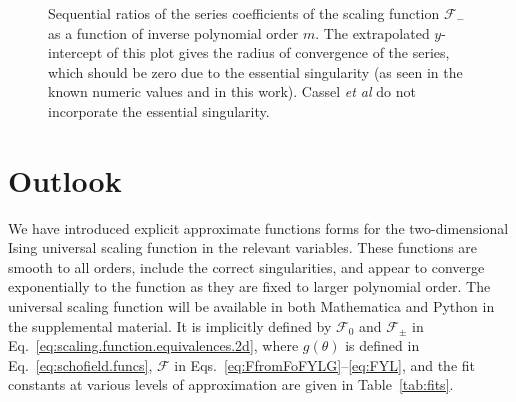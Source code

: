 \documentclass[
aps,
pre,
preprint,
longbibliography,
floatfix
]{revtex4-2}
\begin{document}
\begin{figure}
  \caption{
    Sequential ratios of the series coefficients of the scaling function
    $\mathcal F_-$ as a function of inverse polynomial order $m$. The
    extrapolated $y$-intercept of this plot gives the radius of convergence of
    the series, which should be zero due to the essential singularity (as seen in the known numeric values and in this work). Cassel {\em et al} do not incorporate the essential singularity.
  } \label{fig:glow.radius}
\end{figure}

\section{Outlook}

We have introduced explicit approximate functions forms for the two-dimensional
Ising universal scaling function in the relevant variables. These functions are
smooth to all orders, include the correct singularities, and appear to converge
exponentially to the function as they are fixed to larger polynomial order. The universal scaling function will be available in both Mathematica and Python in the supplemental material. It is implicitly defined by $\mathcal{F}_0$ and $\mathcal{F}_\pm$ in Eq.~\eqref{eq:scaling.function.equivalences.2d}, where $g(\theta)$ is defined in Eq.~\eqref{eq:schofield.funcs}, $\mathcal{F}$ in Eqs.~\eqref{eq:FfromFoFYLG}--\eqref{eq:FYL}, and the fit constants at various levels of approximation are given in Table~\ref{tab:fits}.
\end{document}
